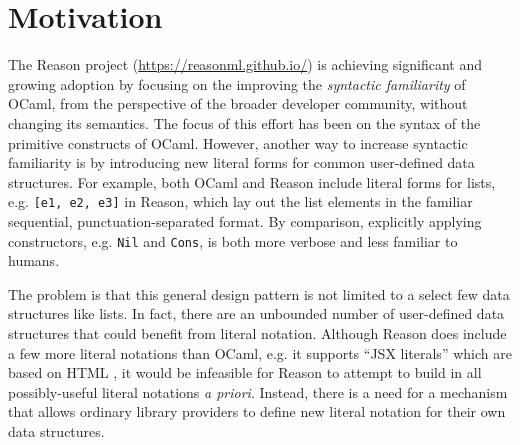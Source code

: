 \documentclass[acmsmall,review]{acmart}
\newcommand{\li}[1]{\lstinline[basicstyle=\ttfamily\fontsize{9pt}{1em}\selectfont]{#1}}
\theoremstyle{slplain}
\numberwithin{thm}{section}
\begin{document}




\maketitle
\thispagestyle{empty} %

\section{Motivation}

The Reason project (\url{https://reasonml.github.io/}) is achieving significant and growing adoption by focusing on the improving the \emph{syntactic familiarity} of OCaml, from the perspective of the broader developer community, without changing its semantics. The focus of this effort has been on the syntax of the primitive constructs of OCaml. However, another way to increase syntactic familiarity is by introducing new {literal forms} for common user-defined data structures. For example, both OCaml and Reason include literal forms for lists, e.g. \li{[e1, e2, e3]} in Reason, which lay out the list elements in the familiar sequential, punctuation-separated format. By comparison, explicitly applying constructors, e.g. \li{Nil} and \li{Cons}, is both more verbose and less familiar to humans.

The problem is that this general design pattern is not limited to a select few data structures like lists. In fact, there are an  unbounded number of user-defined data structures that could benefit from literal notation. Although Reason does include a few more literal notations than OCaml, e.g. it supports ``JSX literals'' which are based on HTML \cite{JSX}, it would be infeasible for Reason to attempt to build in all possibly-useful literal notations \emph{a priori}. Instead, there is a need for a mechanism that allows ordinary library providers to define new literal notation for their own data structures.
\end{document}
